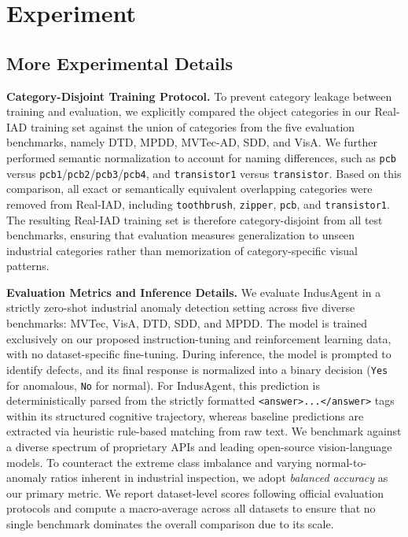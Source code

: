 \documentclass{article}
\begin{document}
{\section{Experiment}
\label{appx:Experimentapp}




\subsection{More Experimental Details}
\label{appx:exp_details}

\textbf{Category-Disjoint Training Protocol.}
To prevent category leakage between training and evaluation, we explicitly compared the object categories in our Real-IAD training set against the union of categories from the five evaluation benchmarks, namely DTD, MPDD, MVTec-AD, SDD, and VisA. 
We further performed semantic normalization to account for naming differences, such as \texttt{pcb} versus \texttt{pcb1}/\texttt{pcb2}/\texttt{pcb3}/\texttt{pcb4}, and \texttt{transistor1} versus \texttt{transistor}. 
Based on this comparison, all exact or semantically equivalent overlapping categories were removed from Real-IAD, including \texttt{toothbrush}, \texttt{zipper}, \texttt{pcb}, and \texttt{transistor1}. 
The resulting Real-IAD training set is therefore category-disjoint from all test benchmarks, ensuring that evaluation measures generalization to unseen industrial categories rather than memorization of category-specific visual patterns.


\textbf{Evaluation Metrics and Inference Details.}
We evaluate IndusAgent in a strictly zero-shot industrial anomaly detection setting across five diverse benchmarks: MVTec, VisA, DTD, SDD, and MPDD. The model is trained exclusively on our proposed instruction-tuning and reinforcement learning data, with no dataset-specific fine-tuning. During inference, the model is prompted to identify defects, and its final response is normalized into a binary decision (\texttt{Yes} for anomalous, \texttt{No} for normal). For IndusAgent, this prediction is deterministically parsed from the strictly formatted \texttt{<answer>...</answer>} tags within its structured cognitive trajectory, whereas baseline predictions are extracted via heuristic rule-based matching from raw text. We benchmark against a diverse spectrum of proprietary APIs and leading open-source vision-language models. To counteract the extreme class imbalance and varying normal-to-anomaly ratios inherent in industrial inspection, we adopt \emph{balanced accuracy} as our primary metric. We report dataset-level scores following official evaluation protocols and compute a macro-average across all datasets to ensure that no single benchmark dominates the overall comparison due to its scale.

}
\end{document}
